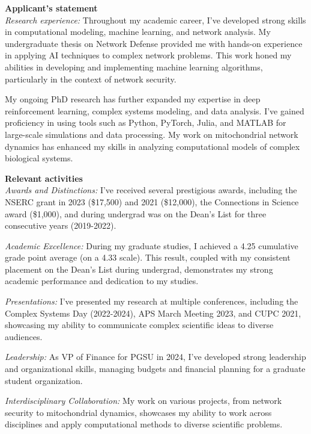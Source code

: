 \begin{contributions}
\textbf{Applicant's statement}\\
\textit{Research experience:} Throughout my academic career, I've developed strong skills in computational modeling, machine learning, and network analysis. My undergraduate thesis on Network Defense provided me with hands-on experience in applying AI techniques to complex network problems. This work honed my abilities in developing and implementing machine learning algorithms, particularly in the context of network security.

My ongoing PhD research has further expanded my expertise in deep reinforcement learning, complex systems modeling, and data analysis. I've gained proficiency in using tools such as Python, PyTorch, Julia, and MATLAB for large-scale simulations and data processing. My work on mitochondrial network dynamics has enhanced my skills in analyzing computational models of complex biological systems.

\textbf{Relevant activities}\\
\textit{Awards and Distinctions:} I've received several prestigious awards, including the NSERC grant in 2023 (\$17,500) and 2021 (\$12,000), the Connections in Science award (\$1,000), and during undergrad was on the Dean's List for three consecutive years (2019-2022).

\textit{Academic Excellence:} During my graduate studies, I achieved a 4.25 cumulative grade point average (on a 4.33 scale). This result, coupled with my consistent placement on the Dean's List during undergrad, demonstrates my strong academic performance and dedication to my studies.

\textit{Presentations:} I've presented my research at multiple conferences, including the Complex Systems Day (2022-2024), APS March Meeting 2023, and CUPC 2021, showcasing my ability to communicate complex scientific ideas to diverse audiences.

\textit{Leadership:} As VP of Finance for PGSU in 2024, I've developed strong leadership and organizational skills, managing budgets and financial planning for a graduate student organization.


\textit{Interdisciplinary Collaboration:} My work on various projects, from network security to mitochondrial dynamics, showcases my ability to work across disciplines and apply computational methods to diverse scientific problems.
\end{contributions}

